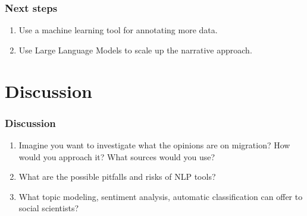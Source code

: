 \documentclass[aspectratio=169]{beamer}
\begin{document}
\begin{frame}
   \frametitle{Next steps}
   \begin{enumerate}
      \item Use a machine learning tool for annotating more data.
      \item Use Large Language Models to scale up the narrative approach.
   \end{enumerate}
\end{frame}

\section{Discussion}

\begin{frame}
   \frametitle{Discussion}
   \begin{enumerate}
      \item Imagine you want to investigate what the opinions are on migration? How would you approach it? What sources would you use?
      \item What are the possible pitfalls and risks of NLP tools?
      \item What topic modeling, sentiment analysis, automatic classification
      can offer to social scientists?
   \end{enumerate}
\end{frame}
\end{document}

